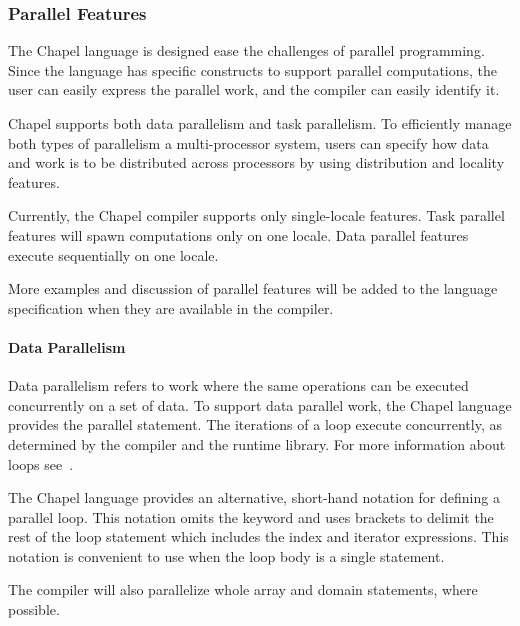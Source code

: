 \subsubsection{Parallel Features}
The Chapel language is designed ease the challenges of parallel 
programming.  Since the language has specific constructs to support
parallel computations, the user can easily express the parallel 
work, and the compiler can easily identify it.

Chapel supports both data parallelism and task
parallelism.  To efficiently manage both types of parallelism 
a multi-processor system, users can specify how data and
work is to be distributed across processors by using
distribution and locality features.

\begin{status}
Currently, the Chapel compiler supports only single-locale features.
Task parallel features will spawn computations only on one locale.
Data parallel features execute sequentially on one locale.  

More examples and discussion of parallel features will be added to
the language specification when they are available in the compiler.
\end{status}

\paragraph{Data Parallelism}
Data parallelism refers to work where the same operations can be executed 
concurrently on a set of data.  
To support data parallel work, the Chapel language provides the parallel 
 statement.  The iterations of 
a  loop execute concurrently, as determined by the compiler 
and the runtime library.  For more information about 
loops see~.

The Chapel language provides an alternative, short-hand notation for 
defining a parallel loop.  This notation omits the  keyword
and uses brackets to delimit the rest of the loop statement which includes
the index and iterator expressions.  This notation is convenient to use
when the loop body is a single statement.  

The compiler will also parallelize whole array and domain statements, 
where possible.

